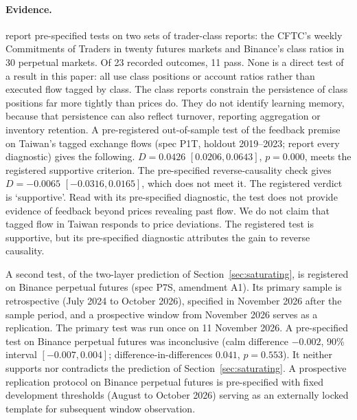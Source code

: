 \documentclass[12pt]{article}
\theoremstyle{definition}
\theoremstyle{remark}
\begin{document}
\paragraph{Evidence.} \citet{niroula2026a} report pre-specified tests on two sets of trader-class reports: the CFTC's weekly Commitments of Traders in twenty futures markets and Binance's class ratios in 30 perpetual markets. Of 23 recorded outcomes, 11 pass. None is a direct test of a result in this paper: all use class positions or account ratios rather than executed flow tagged by class. The class reports constrain the persistence of class positions far more tightly than prices do. They do not identify learning memory, because that persistence can also reflect turnover, reporting aggregation or inventory retention. A pre-registered out-of-sample test of the feedback premise on Taiwan's tagged exchange flows (spec P1T, holdout 2019--2023; \citet{niroula2026a} report every diagnostic) gives the following. $D=0.0426$ $[0.0206, 0.0643]$, $p=0.000$, meets the registered supportive criterion. The pre-specified reverse-causality check gives $D=-0.0065$ $[-0.0316, 0.0165]$, which does not meet it. The registered verdict is `supportive'. Read with its pre-specified diagnostic, the test does not provide evidence of feedback beyond prices revealing past flow. We do not claim that tagged flow in Taiwan responds to price deviations. The registered test is supportive, but its pre-specified diagnostic attributes the gain to reverse causality.

A second test, of the two-layer prediction of Section~\ref{sec:saturating}, is registered on Binance perpetual futures (spec P7S, amendment A1). Its primary sample is retrospective (July 2024 to October 2026), specified in November 2026 after the sample period, and a prospective window from November 2026 serves as a replication. The primary test was run once on 11 November 2026. A pre-specified test on Binance perpetual futures was inconclusive (calm difference $-0.002$, 90\% interval $[-0.007, 0.004]$; difference-in-differences $0.041$, $p=0.553$). It neither supports nor contradicts the prediction of Section~\ref{sec:saturating}. A prospective replication protocol on Binance perpetual futures is pre-specified with fixed development thresholds (August to October 2026) serving as an externally locked template for subsequent window observation.
\end{document}
